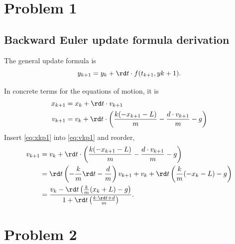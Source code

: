 \section*{Problem 1}
\subsection*{Backward Euler update formula derivation}
The general update formula is
\begin{equation}
 y_{k+1} = y_k + \rd t \cdot f(t_{k+1}, y{k+1}).
\end{equation}

In concrete terms for the equations of motion, it is
\begin{subequations}
 \begin{align}
  x_{k+1} &= x_k + \rd t \cdot v_{k+1}
  \label{eq:xkp1}\\
  v_{k+1} &= v_k + \rd t \cdot \left( \frac{k(-x_{k+1} -L)}{m} - \frac{d\cdot v_{k+1}}{m} -g \right)
  \label{eq:vkp1}
 \end{align}
\end{subequations}
Insert \eqref{eq:xkp1} into \eqref{eq:vkp1} and reorder,
\begin{subequations}
 \begin{align}
  v_{k+1} &= v_k + \rd t \cdot \left( \frac{k(-x_{k+1} -L)}{m} - \frac{d\cdot v_{k+1}}{m} -g \right)\\
          &= \rd t\left(-\frac{k}{m}\rd t - \frac{d}{m}\right) v_{k+1} + v_k + \rd t\left( \frac{k}{m}(-x_k-L)-g \right)\\
          &= \frac{ v_k -\rd t \left(\frac{k}{m} (x_k + L) -g \right)}{1+\rd t \left( \frac{k\cdot \rd t + d}{m} \right)}.
 \end{align}
\end{subequations}
\section*{Problem 2}
